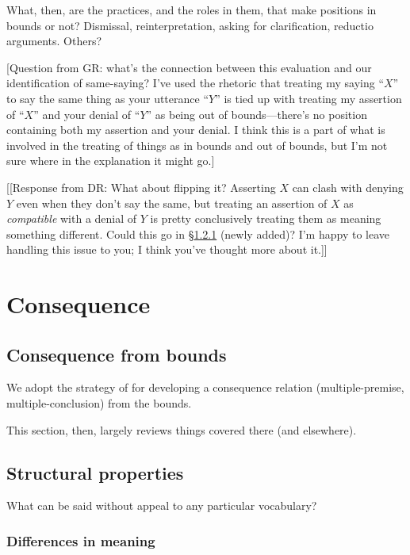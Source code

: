 \documentclass{article}
\begin{document}
What, then, are the practices, and the roles in them, that make positions in bounds or not?
Dismissal, reinterpretation, asking for clarification, reductio arguments. Others? 

[Question from GR: what's the connection between this evaluation and our identification of same-saying? I've used the rhetoric that treating my saying ``$X$'' to say the same thing as your utterance ``$Y$'' is tied up with treating my assertion of ``$X$'' and your denial of ``$Y$'' as being out of bounds---there's no position containing both my assertion and your denial. I think this is a part of what is involved in the treating of things as in bounds and out of bounds, but I'm not sure where in the explanation it might go.]

[[Response from DR: What about flipping it? Asserting $X$ can clash with denying $Y$ even when they don't say the same, but treating an assertion of $X$ as {\em compatible} with a denial of $Y$ is pretty conclusively treating them as meaning something different. Could this go in \S\ref{identity} (newly added)? I'm happy to leave handling this issue to you; I think you've thought more about it.]]

\section{Consequence} \label{consequence}

\subsection{Consequence from bounds}

We adopt the strategy of \cite{restall:mc} for developing a consequence relation (multiple-premise, multiple-conclusion) from the bounds.

This section, then, largely reviews things covered there (and elsewhere).


\subsection{Structural properties}

What can be said without appeal to any particular vocabulary?


\subsubsection{Differences in meaning} \label{identity}
\end{document}
